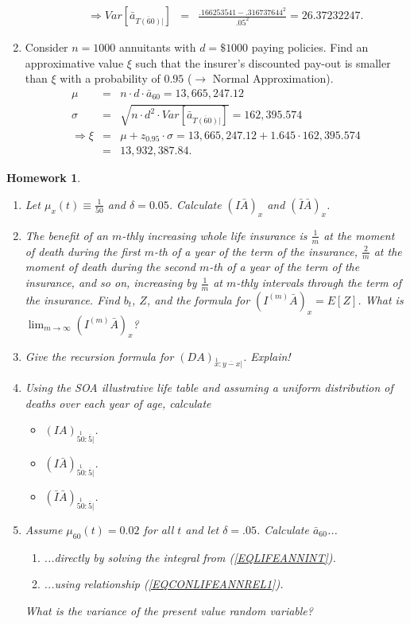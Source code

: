 \documentclass[11pt,fleqn,oneside]{book}
\newtheorem{homework}{Homework}
\begin{document}
\begin{enumerate}
\begin{enumerate}
\begin{eqnarray*}
\Rightarrow Var[{\bar{a}_{\overline{T(60)}|}}] &=& \frac{.166253541 - .316737644^2}{.05^2} = 26.37232247.
\end{eqnarray*}
\end{enumerate}
\item Consider $n=1000$ annuitants with $d=\$1000$ paying policies. Find an approximative value $\xi$ such that the insurer's discounted pay-out is smaller than $\xi$ with a probability of $0.95$ ($\rightarrow$ Normal Approximation).
\begin{eqnarray*}
\mu &=& n\cdot d\cdot \bar{a}_{60} = 13,665,247.12\\
\sigma &=& \sqrt{n\cdot d^2\cdot Var\left[\bar{a}_{\overline{T(60)}|}\right]} = 162,395.574\\
\Rightarrow \xi &=& \mu + z_{0.95}\cdot \sigma = 13,665,247.12 + 1.645 \cdot 162,395.574 \\
&=& 13,932,387.84.
\end{eqnarray*}
\end{enumerate}

\begin{homework}
\label{HW15}
\begin{enumerate}
\item Let $\mu_x(t) \equiv \frac{1}{50}$ and $\delta = 0.05$. Calculate $\left(I \bar{A}\right)_x$ and $\left(\bar{I} \bar{A}\right)_x$.
\item The benefit of an $m$-thly increasing whole life insurance is $\frac{1}{m}$ at the moment of death during the first $m$-th of a year of the term of the insurance, $\frac{2}{m}$ at the moment of death during the second $m$-th of a year of the term of the insurance, and so on, increasing by $\frac{1}{m}$ at $m$-thly intervals through the term of the insurance. Find $b_t$, $Z$, and the formula for $\left(I^{(m)}\bar{A}\right)_x = E[Z]$. What is $\lim_{m\rightarrow \infty}\left(I^{(m)}\bar{A}\right)_x$?
\item Give the recursion formula for $\left(DA\right)_{\stackrel{1}{x}:\overline{y-x}|}$. Explain!
\item Using the SOA  illustrative life table and assuming a uniform distribution of deaths over each year of age, calculate
\begin{itemize}
\item $\left(IA\right)_{\stackrel{1}{50}:\overline{5}|}$.
\item $\left(I\bar{A}\right)_{\stackrel{1}{50}:\overline{5}|}$.
\item $\left(\bar{I}\bar{A}\right)_{\stackrel{1}{50}:\overline{5}|}$.
\end{itemize}
\item Assume $\mu_{60}(t) = 0.02$ for all $t$ and let $\delta=.05$. Calculate $\bar{a}_{60}$...
\begin{enumerate}
\item ...directly by solving the integral from (\ref{EQLIFEANNINT}).
\item ...using relationship (\ref{EQCONLIFEANNREL1}).
\end{enumerate}
What is the variance of the present value random variable?
\end{enumerate}
\end{homework}
\newpage
\end{document}
